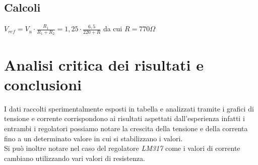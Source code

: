\documentclass[12pt]{article}
\begin{document}
        \subsection{Calcoli}
        $V_{ref}=V_u\cdot \frac{R_1}{R_1+R_2}=1,25\cdot \frac{6,5}{220+R}$ da cui $R=770\Omega$
    \section{Analisi critica dei risultati e conclusioni}
    I dati raccolti sperimentalmente esposti in tabella e analizzati tramite  i grafici di tensione
    e corrente corrispondono ai risultati aspettati dall'esperienza infatti i entrambi i regolatori
    possiamo notare la crescita della tensione e della correnta fino a un determinato valore in cui
    si stabilizzano i valori.\\
    Si può inoltre notare nel caso del regolatore \textit{LM317} come i valori di corrente cambiano
    utilizzando vari valori di resistenza.\\
\end{document}
